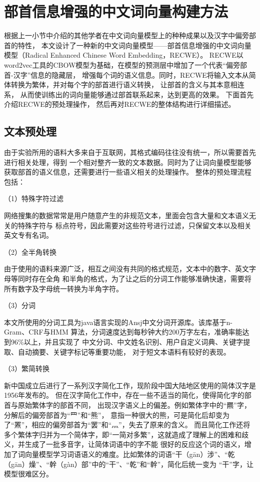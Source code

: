 \documentclass{standalone}
\begin{document}
\section{部首信息增强的中文词向量构建方法}
根据上一小节中介绍的其他学者在中文词向量模型上的种种成果以及汉字中偏旁部首的特性，
本文设计了一种新的中文词向量模型——部首信息增强的中文词向量模型（Radical Enhanced Chinese Word Embedding，RECWE）。
RECWE以word2vec工具的CBOW模型为基础，在模型的预测层中增加了一个代表“偏旁部首-汉字”信息的隐藏层，
增强每个词的语义信息。同时，RECWE将输入文本从简体转换为繁体，并对每个字的部首进行语义转换，
让部首的含义与其本意相连系，
从而使训练出的词向量能够通过部首联系起来，达到更高的效果。
下面首先介绍RECWE的预处理操作，
然后再对RECWE的整体结构进行详细描述。
\subsection{文本预处理}
由于实验所用的语料大多来自于互联网，其格式编码往往没有统一，所以需要首先进行相关处理，得到
一个相对整齐一致的文本数据。同时为了让词向量模型能够获取部首的语义信息，还需要进行一些语义相关的处理操作。
整体的预处理流程包括：

（1）特殊字符过滤

网络搜集的数据常常是用户随意产生的非规范文本，里面会包含大量和文本语义无关的特殊字符与
标点符号，因此需要对这些符号进行过滤，只保留文本以及相关英文专有名词。

（2）全半角转换

由于使用的语料来源广泛，相互之间没有共同的格式规范，文本中的数字、英文字母等同时存在全角
和半角的格式，为了让之后的分词工作能够准确快速，需要将所有数字及字母统一转换为半角字符。

（3）分词

本文所使用的分词工具为java语言实现的Ansj中文分词开源库。该库基于n-Gram、CRF与HMM
算法，分词速度达到每秒钟大约200万字左右，准确率能达到96\%以上，并且实现了
中文分词、中文姓名识别、用户自定义词典、关键字提取、自动摘要、关键字标记等重要功能，
对于短文本语料有较好的表现。

（3）繁简转换

新中国成立后进行了一系列汉字简化工作，现阶段中国大陆地区使用的简体汉字是1956年发布的。
但在汉字简化工作中，存在一些不适当的简化，使得简化字的部首与原始繁体字的部首不同，
出现汉字语义上的偏差。例如繁体字中的“羆”字，分解后的偏旁部首为“罒”和“熊”，
意指一种很大的熊，可是简化后却变为了“罴”，相应的偏旁部首为“罢”和“灬”，失去了原来的含义。
而且简化工作还将多个繁体字归并为一个简体字，即“一简对多繁”，这就造成了理解上的困难和歧义，并生成了一批多音字，让简体词语中的字不能
很好的反应这个词的语义，增加了词向量模型学习词语语义的难度。比如繁体的词语“干（gān）涉”、“乾（gān）燥”、“幹（gàn）部”中的“干”、“乾”和“幹”，简化后统一变为
“干”字，让模型很难区分。
\end{document}
